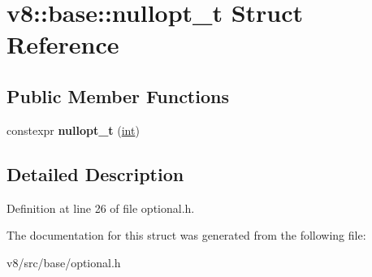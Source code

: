 \hypertarget{structv8_1_1base_1_1nullopt__t}{}\section{v8\+:\+:base\+:\+:nullopt\+\_\+t Struct Reference}
\label{structv8_1_1base_1_1nullopt__t}
\subsection*{Public Member Functions}
\begin{DoxyCompactItemize}
\item 
\mbox{\label{structv8_1_1base_1_1nullopt__t_aaa1b98700fdbeec9dff62ac0ab4c1cd9}} 
constexpr {\bfseries nullopt\+\_\+t} (\mbox{\hyperlink{classint}{int}})
\end{DoxyCompactItemize}


\subsection{Detailed Description}


Definition at line 26 of file optional.\+h.



The documentation for this struct was generated from the following file\+:\begin{DoxyCompactItemize}
\item 
v8/src/base/optional.\+h\end{DoxyCompactItemize}

